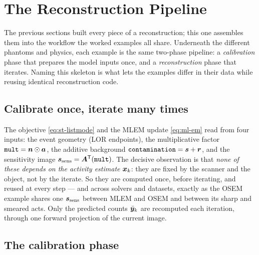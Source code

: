 \section{The Reconstruction Pipeline}
\label{sec:pipeline}

The previous sections built every piece of a reconstruction; this one assembles
them into the workflow the worked examples all share. Underneath the different
phantoms and physics, each example is the same two-phase pipeline: a
\emph{calibration} phase that prepares the model inputs once, and a
\emph{reconstruction} phase that iterates. Naming this skeleton is what lets the
examples differ in their data while reusing identical reconstruction code.

\subsection{Calibrate once, iterate many times}
\label{sec:pipeline:twophase}

The objective \eqref{eq:st-listmode} and the MLEM update \eqref{eq:ml-em} read
from four inputs: the event geometry (LOR endpoints), the multiplicative factor
$\texttt{mult}=\bm{n}\odot\bm{a}$, the additive background
$\texttt{contamination}=\bm{s}+\bm{r}$, and the sensitivity image
$\bm{s}_{\mathrm{sens}}=\bm{A}^{\mathsf{T}}(\texttt{mult})$. The decisive observation is that \emph{none of these
depends on the activity estimate} $\bm{x}_k$: they are fixed by the scanner and the
object, not by the iterate. So they are computed once, before iterating, and
reused at every step --- and across solvers and datasets, exactly as the OSEM
example shares one $\bm{s}_{\mathrm{sens}}$ between MLEM and OSEM and between its sharp and
smeared acts. Only the predicted counts $\bar{\bm{y}}_k$ are recomputed each iteration,
through one forward projection of the current image.

\subsection{The calibration phase}
\label{sec:pipeline:calib}

